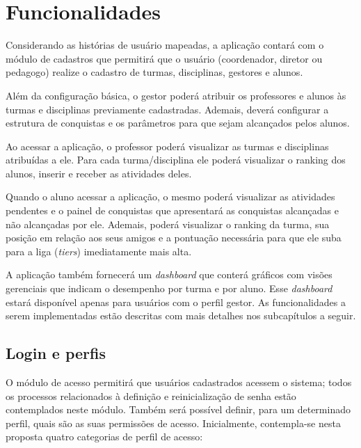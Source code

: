 \section{Funcionalidades}
Considerando as histórias de usuário mapeadas, a aplicação contará com o módulo de cadastros que permitirá que o usuário (coordenador, diretor ou pedagogo) realize o cadastro de turmas, disciplinas, gestores e alunos.


Além da configuração básica, o gestor poderá atribuir os professores e alunos às turmas e disciplinas previamente cadastradas. Ademais, deverá configurar a estrutura de conquistas e os parâmetros para que sejam alcançados pelos alunos.


Ao acessar a aplicação, o professor poderá visualizar as turmas e disciplinas atribuídas a ele. Para cada turma/disciplina ele poderá visualizar o ranking dos alunos, inserir e receber as atividades deles.


Quando o aluno acessar a aplicação, o mesmo poderá visualizar as atividades pendentes e o painel de conquistas que apresentará as conquistas alcançadas e não alcançadas por ele. Ademais, poderá visualizar o ranking da turma, sua posição em relação aos seus amigos e a pontuação necessária para que ele suba para a liga (\textit{\glspl{tier}}) imediatamente mais alta.


A aplicação também fornecerá um \textit{\gls{dashboard}} que conterá gráficos com visões gerenciais que indicam o desempenho por turma e por aluno. Esse \textit{\gls{dashboard}} estará disponível apenas para  usuários com o perfil gestor.
As funcionalidades a serem implementadas estão descritas com mais detalhes nos subcapítulos a seguir. 


\subsection{Login e perfis}
O módulo de acesso permitirá que usuários cadastrados acessem o sistema; todos os processos relacionados à definição e reinicialização de senha estão contemplados neste módulo. Também será possível definir, para um determinado perfil, quais são as suas permissões de acesso.
Inicialmente, contempla-se nesta proposta quatro categorias de perfil de acesso: 


